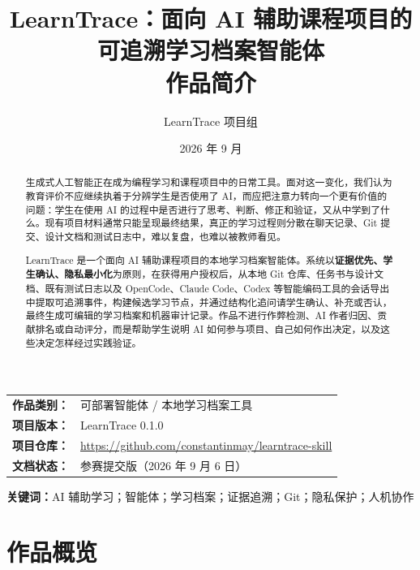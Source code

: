 \documentclass[UTF8,a4paper,12pt]{ctexart}
\title{\vspace{-1.5cm}\textbf{LearnTrace：面向 AI 辅助课程项目的\\可追溯学习档案智能体}\\[0.6em]
\large 作品简介}
\author{LearnTrace 项目组}
\date{2026 年 9 月}
\begin{document}
\maketitle
\thispagestyle{fancy}

\begin{center}
\small
\begin{tabular}{rl}
\textbf{作品类别：} & 可部署智能体 / 本地学习档案工具 \\
\textbf{项目版本：} & LearnTrace 0.1.0 \\
\textbf{项目仓库：} & \url{https://github.com/constantinmay/learntrace-skill} \\
\textbf{文档状态：} & 参赛提交版（2026 年 9 月 6 日）
\end{tabular}
\end{center}

\begin{abstract}
生成式人工智能正在成为编程学习和课程项目中的日常工具。面对这一变化，我们认为教育评价不应继续执着于分辨学生是否使用了 AI，而应把注意力转向一个更有价值的问题：学生在使用 AI 的过程中是否进行了思考、判断、修正和验证，又从中学到了什么。现有项目材料通常只能呈现最终结果，真正的学习过程则分散在聊天记录、Git 提交、设计文档和测试日志中，难以复盘，也难以被教师看见。

LearnTrace 是一个面向 AI 辅助课程项目的本地学习档案智能体。系统以\textbf{证据优先、学生确认、隐私最小化}为原则，在获得用户授权后，从本地 Git 仓库、任务书与设计文档、既有测试日志以及 OpenCode、Claude Code、Codex 等智能编码工具的会话导出中提取可追溯事件，构建候选学习节点，并通过结构化追问请学生确认、补充或否认，最终生成可编辑的学习档案和机器审计记录。作品不进行作弊检测、AI 作者归因、贡献排名或自动评分，而是帮助学生说明 AI 如何参与项目、自己如何作出决定，以及这些决定怎样经过实践验证。
\end{abstract}

\noindent\textbf{关键词：}AI 辅助学习；智能体；学习档案；证据追溯；Git；隐私保护；人机协作

\clearpage
\tableofcontents
\clearpage

\section{作品概览}
\end{document}
